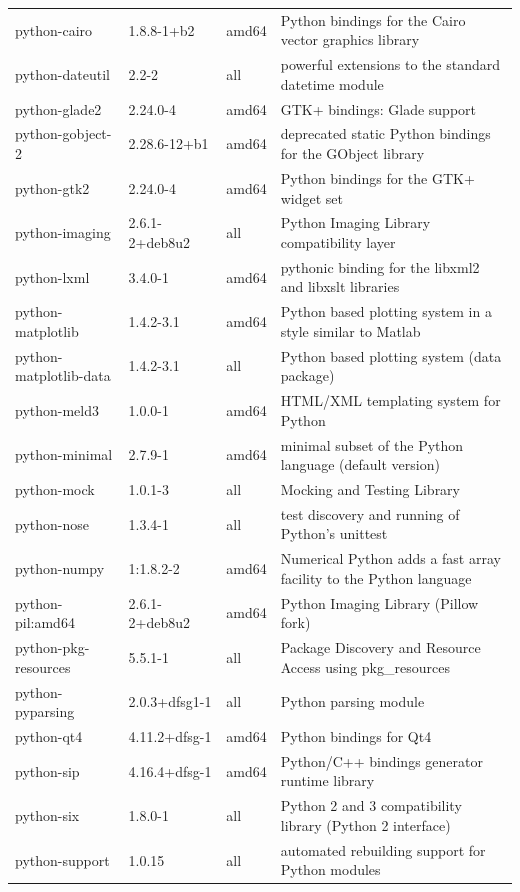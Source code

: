 \documentclass[a4paper,10pt]{article}
\begin{document}
\begin{appendices}
{\begin{longtable}{p{3.25cm}@{\hspace{0.25cm}}p{4cm}@{\hspace{0.25cm}}l@{\hspace{0.25cm}}p{7cm}}
python-cairo	&	1.8.8-1+b2	&	amd64	&	Python bindings for the Cairo vector graphics library	\\
python-dateutil	&	2.2-2	&	all	&	powerful extensions to the standard datetime module	\\
python-glade2	&	2.24.0-4	&	amd64	&	GTK+ bindings: Glade support	\\
python-gobject-2	&	2.28.6-12+b1	&	amd64	&	deprecated static Python bindings for the GObject library	\\
python-gtk2	&	2.24.0-4	&	amd64	&	Python bindings for the GTK+ widget set	\\
python-imaging	&	2.6.1-2+deb8u2	&	all	&	Python Imaging Library compatibility layer	\\
python-lxml	&	3.4.0-1	&	amd64	&	pythonic binding for the libxml2 and libxslt libraries	\\
python-matplotlib	&	1.4.2-3.1	&	amd64	&	Python based plotting system in a style similar to Matlab	\\
python-matplotlib-data	&	1.4.2-3.1	&	all	&	Python based plotting system (data package)	\\
python-meld3	&	1.0.0-1	&	amd64	&	HTML/XML templating system for Python	\\
python-minimal	&	2.7.9-1	&	amd64	&	minimal subset of the Python language (default version)	\\
python-mock	&	1.0.1-3	&	all	&	Mocking and Testing Library	\\
python-nose	&	1.3.4-1	&	all	&	test discovery and running of Python's unittest	\\
python-numpy	&	1:1.8.2-2	&	amd64	&	Numerical Python adds a fast array facility to the Python language	\\
python-pil:amd64	&	2.6.1-2+deb8u2	&	amd64	&	Python Imaging Library (Pillow fork)	\\
python-pkg-resources	&	5.5.1-1	&	all	&	Package Discovery and Resource Access using pkg\_resources	\\
python-pyparsing	&	2.0.3+dfsg1-1	&	all	&	Python parsing module	\\
python-qt4	&	4.11.2+dfsg-1	&	amd64	&	Python bindings for Qt4	\\
python-sip	&	4.16.4+dfsg-1	&	amd64	&	Python/C++ bindings generator runtime library	\\
python-six	&	1.8.0-1	&	all	&	Python 2 and 3 compatibility library (Python 2 interface)	\\
python-support	&	1.0.15	&	all	&	automated rebuilding support for Python modules	\\

\end{longtable}}
\end{appendices}
\end{document}
